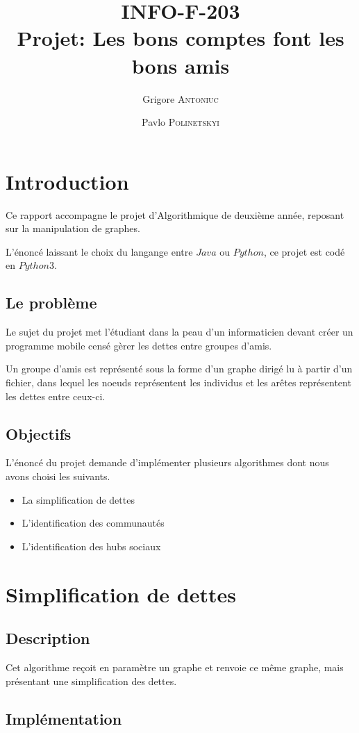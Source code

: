 \documentclass[12pt, oneside]{article}
\title{{\normalsize{INFO-F-203}}\\Projet: Les bons comptes font les bons amis}
\author{Grigore \textsc{Antoniuc} \and Pavlo \textsc{Polinetskyi}}
\begin{document}
\maketitle
\tableofcontents
{}
\newpage
\section{Introduction}
Ce rapport accompagne le projet d'Algorithmique de deuxième année, reposant sur la manipulation de graphes. 

L'énoncé laissant le choix du langange entre $Java$ ou $Python$, ce projet est codé en $Python 3$.   
\subsection{Le problème}
Le sujet du projet met l'étudiant dans la peau d'un informaticien devant créer un programme mobile censé gèrer les dettes entre groupes d'amis. 

Un groupe d'amis est représenté sous la forme d'un graphe dirigé lu à partir d'un fichier, dans lequel les noeuds représentent les individus et les arêtes représentent les dettes entre ceux-ci.

\subsection{Objectifs}
L'énoncé du projet demande d'implémenter plusieurs algorithmes dont nous avons choisi les suivants.
\\
\begin{itemize}
\item La simplification de dettes
\item L'identification des communautés
\item L'identification des hubs sociaux
\end{itemize}
\newpage
\section{Simplification de dettes}

\subsection{Description}
Cet algorithme reçoit en paramètre un graphe et renvoie ce même graphe, mais présentant une simplification des dettes.
\subsection{Implémentation}
\end{document}
